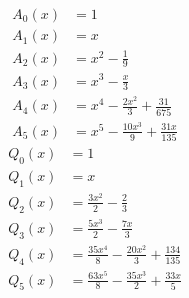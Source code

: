 \begin{align*}
A_0(x)&=1\\
A_1(x)&=x\\
A_2(x)&=x^{2} - \frac{1}{9}\\
A_3(x)&=x^{3} - \frac{x}{3}\\
A_4(x)&=x^{4} - \frac{2 x^{2}}{3} + \frac{31}{675}\\
A_5(x)&=x^{5} - \frac{10 x^{3}}{9} + \frac{31 x}{135}
\end{align*}
\begin{align*}
Q_0(x)&=1\\
Q_1(x)&=x\\
Q_2(x)&=\frac{3 x^{2}}{2} - \frac{2}{3}\\
Q_3(x)&=\frac{5 x^{3}}{2} - \frac{7 x}{3}\\
Q_4(x)&=\frac{35 x^{4}}{8} - \frac{20 x^{2}}{3} + \frac{134}{135}\\
Q_5(x)&=\frac{63 x^{5}}{8} - \frac{35 x^{3}}{2} + \frac{33 x}{5}
\end{align*}
